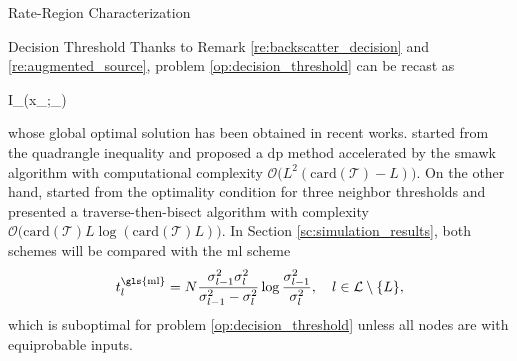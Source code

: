 \begin{section}{Rate-Region Characterization}
\begin{subsection}{Decision Threshold}
		Thanks to Remark \ref{re:backscatter_decision} and \ref{re:augmented_source}, problem \eqref{op:decision_threshold} can be recast as
		\begin{maxi!}
			{}{I_{}(x_{};_{})}{\label{op:decision_threshold_discrete}}{\label{ob:decision_threshold_discrete}}
			\addConstraint{\eqref{co:sequential_threshold},}
		\end{maxi!}
		whose global optimal solution has been obtained in recent works.
		\cite{He2021} started from the quadrangle inequality and proposed a \gls{dp} method accelerated by the \gls{smawk} algorithm with computational complexity $\mathcal{O}\bigl(L^2(\mathrm{card}(\mathcal{T})-L)\bigr)$.
		On the other hand, \cite{Nguyen2020a} started from the optimality condition for three neighbor thresholds and presented a traverse-then-bisect algorithm with complexity $\mathcal{O}\bigl(\mathrm{card}(\mathcal{T})L\log(\mathrm{card}(\mathcal{T})L)\bigr)$.
		In Section \ref{sc:simulation_results}, both schemes will be compared with the \gls{ml} scheme \cite{Qian2019}
		\begin{equation}
			t_{l}^{\text{\gls{ml}}} = N \frac{\sigma_{l-1}^2 \sigma_{l}^2}{\sigma_{l-1}^2 - \sigma_{l}^2} \log \frac{\sigma_{l-1}^2}{\sigma_{l}^2}, \quad l \in \mathcal{L} \setminus \{L\},
			\label{eq:detection_threshold_ml}
		\end{equation}
		which is suboptimal for problem \eqref{op:decision_threshold} unless all nodes are with equiprobable inputs.
	\end{subsection}
\end{section}


